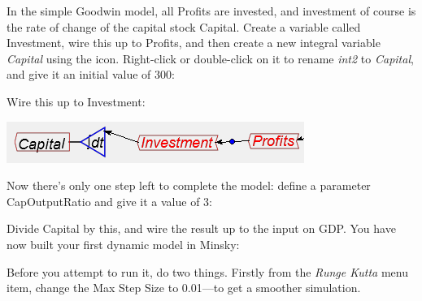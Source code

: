 In the simple Goodwin model, all Profits are invested, and investment
of course is the rate of change of the capital stock Capital. Create
a variable called Investment, wire this up to Profits, and then create
a new integral variable {\em Capital} using the 
icon. Right-click or double-click on it to rename {\em int2} to
{\em Capital}, and give it an initial value of 300:
\begin{center}
\par\end{center}

Wire this up to Investment:
\begin{center}
\includegraphics{images/NewItem104} 
\par\end{center}

Now there's only one step left to complete the model: define a parameter
CapOutputRatio and give it a value of 3:
\begin{center}
\par\end{center}

Divide Capital by this, and wire the result up to the input on GDP.
You have now built your first dynamic model in Minsky:

Before you attempt to run it, do two things. Firstly from the {\em
Runge Kutta} menu item, change the Max Step Size to 0.01---to get
a smoother simulation.
\begin{center}
\par\end{center}

